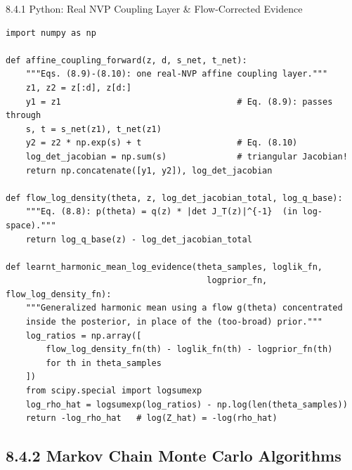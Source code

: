 \documentclass[aspectratio=169,10pt]{beamer}
\begin{document}
\begin{frame}[fragile]{8.4.1 Python: Real NVP Coupling Layer \& Flow-Corrected Evidence}
\begin{lstlisting}
import numpy as np

def affine_coupling_forward(z, d, s_net, t_net):
    """Eqs. (8.9)-(8.10): one real-NVP affine coupling layer."""
    z1, z2 = z[:d], z[d:]
    y1 = z1                                   # Eq. (8.9): passes through
    s, t = s_net(z1), t_net(z1)
    y2 = z2 * np.exp(s) + t                   # Eq. (8.10)
    log_det_jacobian = np.sum(s)              # triangular Jacobian!
    return np.concatenate([y1, y2]), log_det_jacobian

def flow_log_density(theta, z, log_det_jacobian_total, log_q_base):
    """Eq. (8.8): p(theta) = q(z) * |det J_T(z)|^{-1}  (in log-space)."""
    return log_q_base(z) - log_det_jacobian_total

def learnt_harmonic_mean_log_evidence(theta_samples, loglik_fn,
                                        logprior_fn, flow_log_density_fn):
    """Generalized harmonic mean using a flow g(theta) concentrated
    inside the posterior, in place of the (too-broad) prior."""
    log_ratios = np.array([
        flow_log_density_fn(th) - loglik_fn(th) - logprior_fn(th)
        for th in theta_samples
    ])
    from scipy.special import logsumexp
    log_rho_hat = logsumexp(log_ratios) - np.log(len(theta_samples))
    return -log_rho_hat   # log(Z_hat) = -log(rho_hat)
\end{lstlisting}
\end{frame}

\subsection{8.4.2 Markov Chain Monte Carlo Algorithms}
\end{document}
